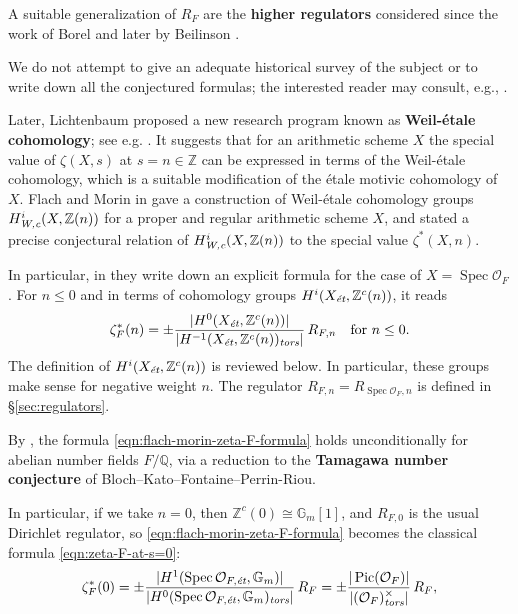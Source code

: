 \documentclass[draft]{article}
\DeclareMathOperator{\Pic}{Pic}
\DeclareMathOperator{\Spec}{Spec}
\newcommand{\QQ}{\mathbb{Q}}
\newcommand{\ZZ}{\mathbb{Z}}
\newcommand{\et}{\text{\it \'{e}t}}
\newcommand{\tors}{\text{\it tors}}
\newcommand{\Wc}{\text{\it W,c}}
\theoremstyle{myplain}
\theoremstyle{mydefinition}
\numberwithin{equation}{section}
\begin{document}
A suitable generalization of $R_F$ are the \textbf{higher regulators} considered
since the work of Borel \cite{Borel-1977} and later by Beilinson
\cite{Beilinson-1984}.

We do not attempt to give an adequate historical survey of the subject or to
write down all the conjectured formulas; the interested reader may consult,
e.g., \cite{Kolster-2004,Goncharov-2005,Kahn-2005}.

\vspace{1em}

Later, Lichtenbaum proposed a new research program known as
\textbf{Weil-\'{e}tale cohomology}; see e.g.
\cite{Lichtenbaum-2005,Lichtenbaum-2009-Euler-char,Lichtenbaum-2009-number-rings,Lichtenbaum-2021}.
It suggests that for an arithmetic scheme $X$ the special value of $\zeta (X,s)$
at $s = n \in \ZZ$ can be expressed in terms of the Weil-\'{e}tale cohomology,
which is a suitable modification of the \'{e}tale motivic cohomology of $X$.
Flach and Morin in \cite{Flach-Morin-2018} gave a construction of Weil-\'{e}tale
cohomology groups $H^i_\Wc (X,\ZZ(n))$ for a proper and regular arithmetic
scheme $X$, and stated a precise conjectural relation of $H^i_\Wc (X,\ZZ(n))$ to
the special value $\zeta^* (X,n)$.

In particular, in \cite[\S 5.8.3]{Flach-Morin-2018} they write down an explicit
formula for the case of $X = \Spec \mathcal{O}_F$. For $n \le 0$ and in terms of
cohomology groups $H^i (X_\et, \ZZ^c (n))$, it reads
\begin{equation}
  \label{eqn:flach-morin-zeta-F-formula}
  \zeta_F^* (n) = \pm\frac{|H^0 (X_\et, \ZZ^c (n))|}{|H^{-1} (X_\et, \ZZ^c (n))_\tors|}\,R_{F,n}
  \quad \text{for }n \le 0.
\end{equation}
The definition of $H^i (X_\et, \ZZ^c (n))$ is reviewed below. In particular,
these groups make sense for negative weight $n$. The regulator
$R_{F,n} = R_{\Spec \mathcal{O}_F,n}$ is defined in \S\ref{sec:regulators}.

By \cite[Proposition~5.35]{Flach-Morin-2018}, the formula
\eqref{eqn:flach-morin-zeta-F-formula} holds unconditionally for abelian number
fields $F/\QQ$, via a reduction to the \textbf{Tamagawa number conjecture} of
Bloch--Kato--Fontaine--Perrin-Riou.

In particular, if we take $n = 0$, then $\ZZ^c (0) \cong \mathbb{G}_m [1]$, and
$R_{F,0}$ is the usual Dirichlet regulator, so
\eqref{eqn:flach-morin-zeta-F-formula} becomes the classical formula
\eqref{eqn:zeta-F-at-s=0}:
\[ \zeta_F^* (0) =
  \pm \frac{|H^1 (\Spec \mathcal{O}_{F,\et}, \mathbb{G}_m)|}{|H^0 (\Spec \mathcal{O}_{F,\et}, \mathbb{G}_m)_\tors|}\,R_F =
  \pm \frac{|\Pic (\mathcal{O}_F)|}{|(\mathcal{O}_F)^\times_\tors|}\,R_F, \]
\end{document}
